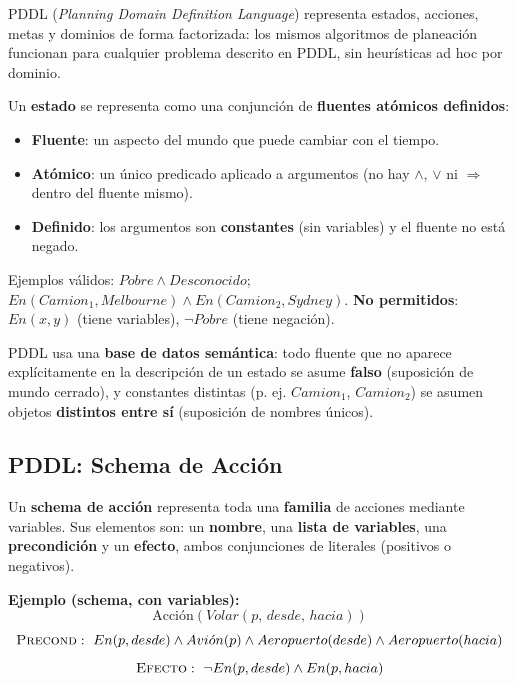 PDDL (\textit{Planning Domain Definition Language}) representa estados, acciones, metas y dominios de
forma factorizada: los mismos algoritmos de planeación funcionan para cualquier problema descrito en
PDDL, sin heurísticas ad hoc por dominio.

\begin{definition}
Un \textbf{estado} se representa como una conjunción de \textbf{fluentes atómicos definidos}:
\begin{itemize}
    \item \textbf{Fluente}: un aspecto del mundo que puede cambiar con el tiempo.
    \item \textbf{Atómico}: un único predicado aplicado a argumentos (no hay $\land$, $\lor$ ni
    $\Rightarrow$ dentro del fluente mismo).
    \item \textbf{Definido}: los argumentos son \textbf{constantes} (sin variables) y el fluente no
    está negado.
\end{itemize}
Ejemplos válidos: $Pobre \land Desconocido$;\quad $En(Camion_1,Melbourne)\land En(Camion_2,Sydney)$.
\textbf{No permitidos}: $En(x,y)$ (tiene variables), $\neg Pobre$ (tiene negación).
\end{definition}

PDDL usa una \textbf{base de datos semántica}: todo fluente que no aparece explícitamente en la
descripción de un estado se asume \textbf{falso} (suposición de mundo cerrado), y constantes distintas
(p. ej. $Camion_1$, $Camion_2$) se asumen objetos \textbf{distintos entre sí} (suposición de nombres
únicos).

\subsection{PDDL: Schema de Acción}

\begin{definition}
Un \textbf{schema de acción} representa toda una \textbf{familia} de acciones mediante variables. Sus
elementos son: un \textbf{nombre}, una \textbf{lista de variables}, una \textbf{precondición} y un
\textbf{efecto}, ambos conjunciones de literales (positivos o negativos).
\end{definition}

\textbf{Ejemplo (schema, con variables):}
\[
    \text{Acci\'on}(Volar(p,\,desde,\,hacia))
\]
\[
    \textsc{Precond}:\ En(p,desde)\land Avi\acute{o}n(p)\land Aeropuerto(desde)\land
    Aeropuerto(hacia)
\]
\[
    \textsc{Efecto}:\ \neg En(p,desde)\land En(p,hacia)
\]

